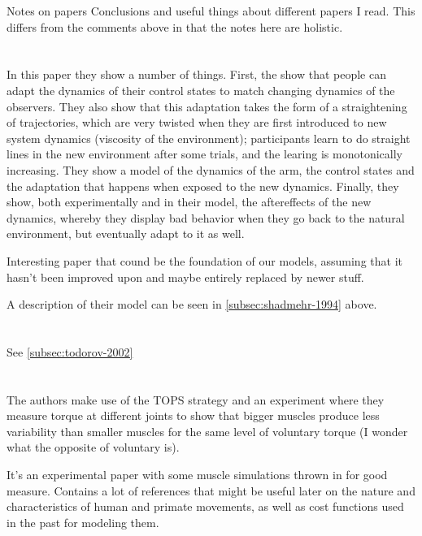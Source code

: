 \documentclass{report}
\begin{document}
\begin{chapter}{Notes on papers}
Conclusions and useful things about different papers I read. This differs from
the comments above in that the notes here are holistic.

\section{\cite{Shadmehr_Adaptive_1994}}
In this paper they show a number of things. First, the show that people can
adapt the dynamics of their control states to match changing dynamics of the
observers. They also show that this adaptation takes the form of a straightening
of trajectories, which are very twisted when they are first introduced to new
system dynamics (viscosity of the environment); participants learn to do
straight lines in the new environment after some trials, and the learing is
monotonically increasing. They show a model of the dynamics of the arm, the
control states and the adaptation that happens when exposed to the new
dynamics. Finally, they show, both experimentally and in their model, the
aftereffects of the new dynamics, whereby they display bad behavior when they go
back to the natural environment, but eventually adapt to it as well.

Interesting paper that cound be the foundation of our models, assuming that it
hasn't been improved upon and maybe entirely replaced by newer stuff.

A description of their model can be seen in \ref{subsec:shadmehr-1994} above.

\section{\cite{Todorov_Optimal_2002}}
See \ref{subsec:todorov-2002}

\section{\cite{deC.Hamilton_scaling_2004}}
The authors make use of the TOPS strategy \citep{Harris_Signaldependent_1998}
and an experiment where they measure torque at different joints to show that
bigger muscles produce less variability than smaller muscles for the same level
of voluntary torque (I wonder what the opposite of voluntary is).

It's an experimental paper with some muscle simulations thrown in for good
measure. Contains a lot of references that might be useful later on the nature
and characteristics of human and primate movements, as well as cost functions
used in the past for modeling them.


\end{chapter}
\end{document}

